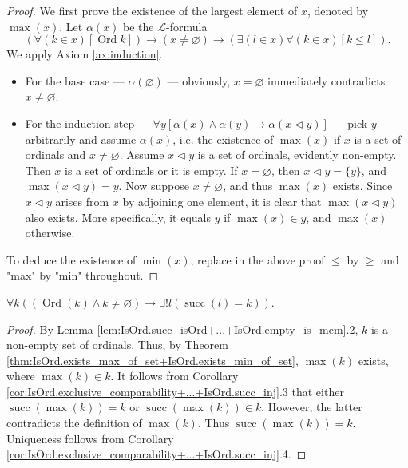 \begin{proof}
    \leanok
    We first prove the existence of the largest element of $x$, denoted by $\max(x)$. 
    Let $\alpha(x)$ be the $\mathcal{L}$-formula 
    $$(\forall (k \in x)[\operatorname{Ord} k]) \rightarrow (x \neq \varnothing) \rightarrow 
    (\exists(l \in x) \forall (k \in x) [k \leq l]).$$ 
    We apply Axiom \ref{ax:induction}.
    \begin{itemize}
        \item For the base case — $\alpha (\varnothing)$ — obviously, $x = \varnothing$ immediately 
        contradicts $x \neq \varnothing$.
        \item For the induction step 
        — $\forall y[\alpha(x) \land \alpha(y) \rightarrow \alpha(x \lhd y)]$ — 
        pick $y$ arbitrarily and assume $\alpha(x)$, 
        i.e. the existence of $\max(x)$ if $x$ is a set of ordinals and $x \neq \varnothing$. 
        Assume $x \lhd y$ is a set of ordinals, evidently non-empty. 
        Then $x$ is a set of ordinals or it is empty.
        If $x=\varnothing$, then $x \lhd y = \{y\}$, and $\max(x\lhd y) = y$.
        Now suppose $x \neq \varnothing$, and thus $\max(x)$ exists. 
        Since $x \lhd y$ arises from $x$ by adjoining one element, it is clear that 
        $\max (x \lhd y)$ also exists. 
        More specifically, it equals $y$ if $\max (x) \in y$, and $\max (x)$ otherwise.
    \end{itemize}
    To deduce the existence of $\min (x)$, 
    replace in the above proof $\leq$ by $\geq$ and "max" by "min" throughout.
\end{proof}

\begin{corollary}
    \label{cor:IsOrd.exists_pred}
    \leanok
    $\forall k ((\operatorname{Ord}(k) \land k \neq \varnothing) \rightarrow 
    \exists!l(\operatorname{succ}(l)=k))$.
\end{corollary}

\begin{proof}
    \leanok
    By Lemma \ref{lem:IsOrd.succ_isOrd+...+IsOrd.empty_is_mem}.2, 
    $k$ is a non-empty set of ordinals. 
    Thus, by Theorem \ref{thm:IsOrd.exists_max_of_set+IsOrd.exists_min_of_set}, 
    $\max (k)$ exists, where $\max (k) \in k$. 
    It follows from Corollary \ref{cor:IsOrd.exclusive_comparability+...+IsOrd.succ_inj}.3 that 
    either $\operatorname{succ}(\max (k)) = k$ or $\operatorname{succ}(\max (k)) \in k$. 
    However, the latter contradicts the definition of $\max (k)$. 
    Thus $\operatorname{succ}(\max (k)) = k$. Uniqueness follows from 
    Corollary \ref{cor:IsOrd.exclusive_comparability+...+IsOrd.succ_inj}.4.
\end{proof}


